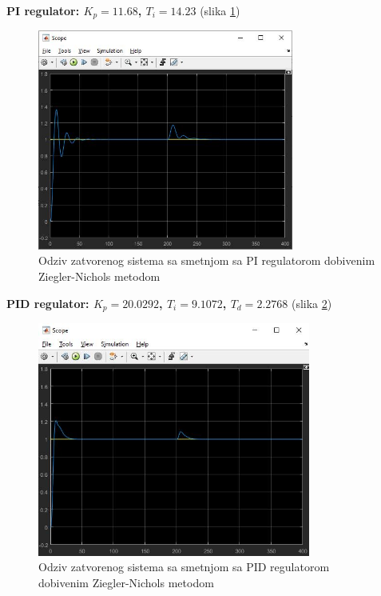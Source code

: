 \textbf{PI regulator: $K_p=11.68$, $T_i=14.23$} (slika \ref{fig:z1_26})
 
\begin{figure} [H]
  \centering
  \includegraphics[width=0.75\textwidth]{z1_26}
  \caption{Odziv zatvorenog sistema sa smetnjom sa PI regulatorom dobivenim Ziegler-Nichols metodom}
  \label{fig:z1_26}
\end{figure} 

\textbf{PID regulator: $K_p=20.0292$, $T_i=9.1072$, $T_d=2.2768$} (slika \ref{fig:z1_27})

\begin{figure} [H]
  \centering
  \includegraphics[width=0.8\textwidth]{z1_27}
  \caption{Odziv zatvorenog sistema sa smetnjom sa PID regulatorom dobivenim Ziegler-Nichols metodom}
  \label{fig:z1_27}
\end{figure} 

